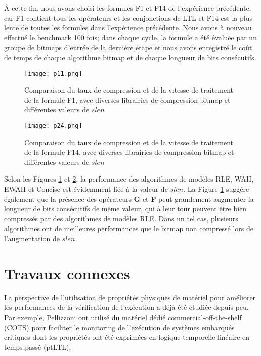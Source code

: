 À cette fin, nous avons choisi les formules F1 et F14 de l'expérience précédente, car F1 contient tous les opérateurs et les conjonctions de LTL et F14 est la plus lente de toutes les formules dans l'expérience précédente. Nous avons à nouveau effectué le benchmark 100 fois; dans chaque cycle, la formule a été évaluée par un groupe de bitmaps d'entrée de la dernière étape et nous avons enregistré le coût de temps de chaque algorithme bitmap et de chaque longueur de bits consécutifs.

\begin{figure}[h]
\begin{center}
\centering
\texttt{[image: p11.png]}
\caption{Comparaison du taux de compression et de la vitesse de traitement de la formule F1, avec diverses librairies de compression bitmap et différentes valeurs de $slen$}
\label{img:f1}
\end{center}
\end{figure}

\begin{figure}[h]
\begin{center}
\centering
\texttt{[image: p24.png]}
\caption{Comparaison du taux de compression et de la vitesse de traitement de la formule F14, avec diverses librairies de compression bitmap et différentes valeurs de $slen$}
\label{img:f14}
\end{center}
\end{figure}

Selon les Figures \ref{img:f1} et \ref{img:f14}, la performance des algorithmes de modèles RLE, WAH, EWAH et Concise est évidemment liée à la valeur de $slen$. La Figure \ref{img:f1} suggère également que la présence des opérateurs \textbf{G} et \textbf{F} peut grandement augmenter la longueur de bits consécutifs de même valeur, qui à leur tour peuvent être bien compressés par des algorithmes de modèles RLE. Dans un tel cas, plusieurs algorithmes ont de meilleures performances que le bitmap non compressé lors de l'augmentation de $slen$.



\section{Travaux connexes}\label{sec:bm:related} %

La perspective de l'utilisation de propriétés physiques de matériel pour améliorer les performances de la vérification de l'exécution a déjà été étudiée depuis peu. Par exemple, Pellizzoni \etal\@ \citep{pellizzoni2008hardware} ont utilisé du matériel dédié commercial-off-the-shelf (COTS) \citep{emerson1990temporal} pour faciliter le monitoring de l'exécution de systèmes embarqués critiques dont les propriétés ont été exprimées en logique temporelle linéaire en temps passé (ptLTL).

